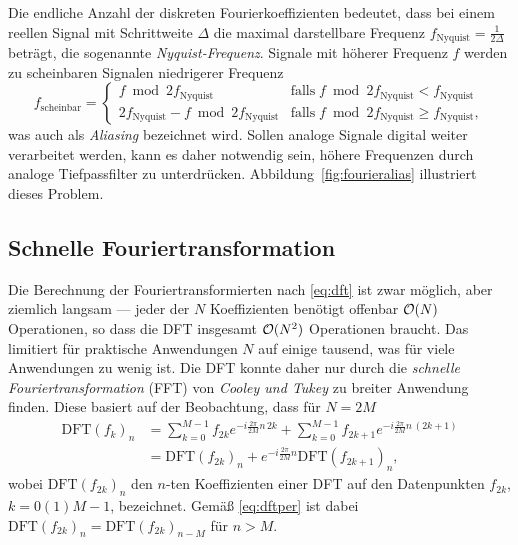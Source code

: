 Die endliche Anzahl der diskreten Fourierkoeffizienten bedeutet, dass
bei einem reellen Signal mit Schrittweite $\Delta$ die maximal
darstellbare Frequenz $f_\text{Nyquist}=\frac{1}{2\Delta}$ beträgt,
die sogenannte
\emph{Nyquist-Frequenz}. Signale mit höherer
Frequenz $f$ werden zu scheinbaren Signalen niedrigerer Frequenz
\begin{equation}
  f_\text{scheinbar} = \begin{cases}
    f \bmod 2 f_\text{Nyquist} & \text{falls}\; f \bmod 2 f_\text{Nyquist}
    < f_\text{Nyquist} \\
    2f_\text{Nyquist} - f \bmod 2 f_\text{Nyquist} & \text{falls}\; f \bmod 2 f_\text{Nyquist}
    \ge f_\text{Nyquist},
  \end{cases}
\end{equation}
was auch als \emph{Aliasing} bezeichnet
wird. Sollen analoge Signale digital weiter verarbeitet werden, kann
es daher notwendig sein, höhere Frequenzen durch analoge
Tiefpassfilter zu unterdrücken. Abbildung~\ref{fig:fourieralias}
illustriert dieses Problem.

\subsection{Schnelle Fouriertransformation}

Die Berechnung der Fouriertransformierten nach \eqref{eq:dft} ist zwar
möglich, aber ziemlich langsam --- jeder der $N$ Koeffizienten
benötigt offenbar $\mathcal O(N)$ Operationen, so dass die DFT insgesamt
$\mathcal O(N^2)$ Operationen braucht. Das limitiert für praktische
Anwendungen $N$ auf einige tausend, was für viele Anwendungen zu wenig
ist. Die DFT konnte daher nur durch die \emph{schnelle
  Fouriertransformation} (FFT) von \emph{Cooley und Tukey} zu breiter
Anwendung finden. Diese basiert auf der Beobachtung, dass für $N=2M$
\begin{align}
  \text{DFT}(f_k)_n &= \sum_{k=0}^{M-1} f_{2k} e^{-i\frac{2\pi}{2M} n\, 2k} +
  \sum_{k=0}^{M-1} f_{2k+1} e^{-i\frac{2\pi}{2M} n\, (2k + 1)}\\
  &= \text{DFT}(f_{2k})_n + e^{-i\frac{2\pi}{2M} n}
  \text{DFT}(f_{2k+1})_n,
\end{align}
wobei $\text{DFT}(f_{2k})_n$ den $n$-ten Koeffizienten einer DFT auf
den Datenpunkten $f_{2k}$, $k=0(1)M-1$, bezeichnet. Gemäß
\eqref{eq:dftper} ist dabei $\text{DFT}(f_{2k})_n =
\text{DFT}(f_{2k})_{n-M}$ für $n>M$.

